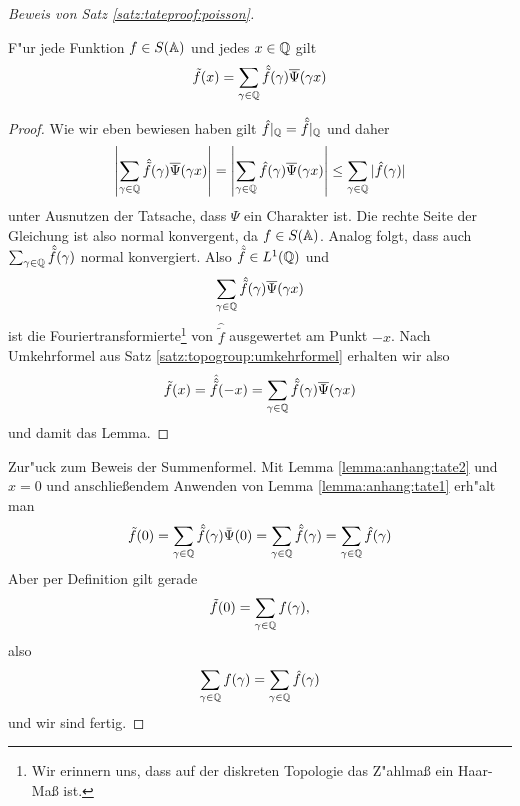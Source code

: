 \begin{proof}[Beweis von Satz \ref{satz:tateproof:poisson}]
		\begin{lemma}\label{lemma:anhang:tate2}
			F"ur jede Funktion $f \in S(\mathbb{A})$ und jedes $x\in \mathbb{Q}$ gilt
			\begin{align*}
				\tilde{f}(x) = \sum_{\gamma \in \mathbb{Q}} {\hat{\tilde{f}}(\gamma)\overline{\Psi}(\gamma x)}
			\end{align*}
		\end{lemma}
		\begin{proof}
			Wie wir eben bewiesen haben gilt $\hat{f}|_{\mathbb{Q}} = \hat{\tilde{f}}|_{\mathbb{Q}}$ und daher
			\begin{align*}
				\left| \sum_{\gamma \in \mathbb{Q}} {\hat{\tilde{f}}(\gamma)\overline{\Psi}(\gamma x)}\right| = 
				\left| \sum_{\gamma \in \mathbb{Q}} {\hat{f}(\gamma)\overline{\Psi}(\gamma x)}\right| 
				\leq \sum_{\gamma \in \mathbb{Q}} {|\hat{f}(\gamma)|}
			\end{align*}
			unter Ausnutzen der Tatsache, dass $\Psi$ ein Charakter ist. Die rechte Seite der Gleichung ist also normal konvergent, da $f \in S(\mathbb{A})$. Analog folgt, dass auch $\sum_{\gamma \in \mathbb{Q}} {\hat{\tilde{f}}(\gamma)}$ normal konvergiert. 
			Also $\hat{\tilde{f}} \in L^1(\mathbb{Q})$ und
			\begin{align*}
				\sum_{\gamma \in \mathbb{Q}} {\hat{\tilde{f}}(\gamma)\overline{\Psi}(\gamma x)}
			\end{align*}
			ist die Fouriertransformierte\footnote{Wir erinnern uns, dass auf der diskreten Topologie das Z"ahlmaß ein Haar-Maß ist.} von $\hat{\tilde{f}}$ ausgewertet am Punkt $-x$.
			Nach Umkehrformel aus Satz \ref{satz:topogroup:umkehrformel} erhalten wir also
			\begin{align*}
				\tilde{f}(x) = \hat{\hat{\tilde{f}}}(-x) = \sum_{\gamma \in \mathbb{Q}} {\hat{\tilde{f}}(\gamma)\overline{\Psi}(\gamma x)}
			\end{align*}
			und damit das Lemma.
		\end{proof}
		Zur"uck zum Beweis der Summenformel. 
		Mit Lemma \ref{lemma:anhang:tate2} und $x=0$ und anschließendem Anwenden von Lemma \ref{lemma:anhang:tate1} erh"alt man
		\begin{align*}
			\tilde{f}(0) = 	\sum_{\gamma \in \mathbb{Q}} \hat{\tilde{f}}(\gamma) \bar{\Psi}(0) =
							\sum_{\gamma \in \mathbb{Q}} \hat{\tilde{f}}(\gamma) =
							\sum_{\gamma \in \mathbb{Q}} \hat{f}(\gamma)
		\end{align*}
		Aber per Definition gilt gerade
		\begin{align*}
			\tilde{f}(0) = \sum_{\gamma \in \mathbb{Q}}f(\gamma),
		\end{align*}
		also
		\begin{align*}
			\sum_{\gamma \in \mathbb{Q}}f(\gamma) = \sum_{\gamma \in \mathbb{Q}} \hat{f}(\gamma)
		\end{align*}
		und wir sind fertig.
	\end{proof}